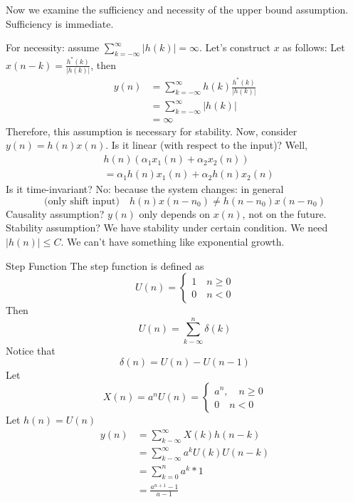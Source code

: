 \documentclass[../main.tex]{subfiles}
\begin{document}
Now we examine the sufficiency and necessity of the upper bound assumption. Sufficiency is immediate. 

For necessity: assume $\sum_{k=-\infty}^\infty |h(k)|=\infty$. Let's construct $x$ as follows: Let $x(n-k)=\frac{h^*(k)}{|h(k)|}$, then \begin{align*}
    y(n) &=\sum_{k=-\infty}^\infty h(k)\frac{h^*(k)}{|h(k)|} \\
    &= \sum_{k=-\infty}^\infty |h(k)| \\
    &=\infty  
\end{align*}
Therefore, this assumption is necessary for stability.
\vspace{10mm}
\newline
Now, consider $y(n)=h(n)x(n)$. Is it linear (with respect to the input)? 
Well, \begin{align*}
    &h(n)(\alpha_1 x_1(n) + \alpha_2 x_2(n))\\
    &=\alpha_1 h(n) x_1(n) + \alpha_2 h(n) x_2(n)
\end{align*}
Is it time-invariant? No: because the system changes: in general \[
\text{(only shift input)}\quad h(n)x(n-n_0) \neq h(n-n_0) x(n-n_0)
\]
Causality assumption? $y(n)$ only depends on $x(n)$, not on the future.
Stability assumption? We have stability under certain condition. We need $|h(n)|\leq C$. We can't have something like exponential growth.

\begin{pbox}{Step Function}
    The step function is defined as \[
    U(n) = \begin{cases}
        1 \quad n\geq 0\\
        0 \quad n < 0
    \end{cases}
    \]
    Then \[
    U(n)=\sum_{k-\infty}^{n} \delta(k)
    \]
    Notice that \[
    \delta(n) = U(n) - U(n-1)
    \]
    Let \[
    X(n) = a^n U(n) =\begin{cases}
        a^n, \quad n\geq 0\\
        0 \quad n<0
    \end{cases}
    \]
    Let $h(n)=U(n)$
    \begin{align*}
        y(n) &= \sum_{k-\infty}^\infty X(k) h(n-k)\\
        &= \sum_{k-\infty}^\infty a^k U(k) U(n-k)\\
        &= \sum_{k=0}^n a^k * 1\\
        &= \frac{a^{n+1} - 1}{a-1}
    \end{align*}
\end{pbox}
\end{document}
